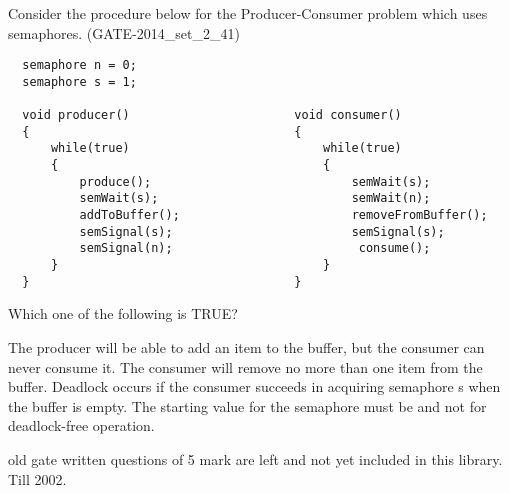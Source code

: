 
\begin{questyle}

  \question  Consider the procedure below for the Producer-Consumer problem which uses semaphores. (GATE-2014\_set\_2\_41)
  \begin{lstlisting}
  semaphore n = 0;
  semaphore s = 1;

  void producer()                       void consumer()
  {                                     {
      while(true)                           while(true)
      {                                     {
          produce();                            semWait(s);
          semWait(s);                           semWait(n);
          addToBuffer();                        removeFromBuffer();
          semSignal(s);                         semSignal(s);
          semSignal(n);                          consume();
      }                                     }
  }                                     }
  \end{lstlisting}

    Which one of the following is TRUE?

  \begin{choices}
    \choice  The producer will be able to add an item to the buffer, but the consumer can never consume it.
    \choice  The consumer will remove no more than one item from the buffer.
    \correctchoice  Deadlock occurs if the consumer succeeds in acquiring semaphore s when the buffer is empty.
    \choice  The starting value for the semaphore must be and not for deadlock-free operation.
  \end{choices}

  \end{questyle}




old gate written questions of 5 mark  are left and not yet included in this library. Till 2002.



